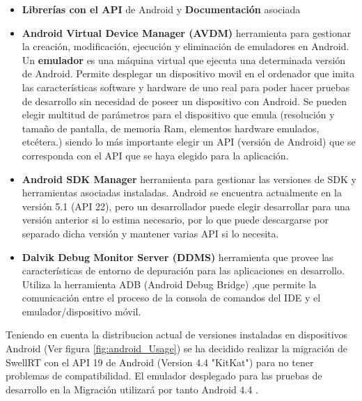    \begin{itemize}
    \item \textbf{Librerías con el API} de Android y \textbf{Documentación} asociada \cite{ref:android_api_reference}
    
    \item \textbf{Android Virtual Device Manager (AVDM)} \cite{ref:android_vdm} herramienta para gestionar la creación, modificación, ejecución y eliminación de emuladores en Android. Un \textbf{emulador} \cite{ref:android_emulator} es una máquina virtual que ejecuta una determinada versión de Android. Permite desplegar un dispositivo movil en el ordenador que imita las características software y hardware de uno real para poder hacer pruebas de desarrollo sin necesidad de poseer un dispositivo con Android. Se pueden elegir multitud de parámetros \cite{ref:android_avd_params} para el dispositivo que emula (resolución y tamaño de pantalla, de memoria Ram, elementos hardware emulados, etcétera.) siendo lo más importante elegir un API (versión de Android) que se corresponda con el API que se haya elegido para la aplicación.
    
    \item \textbf{Android SDK Manager} \cite{ref:android_sdk_manager} herramienta para gestionar las versiones de SDK y herramientas asociadas instaladas. Android se encuentra actualmente en la versión 5.1 (API 22), pero un desarrollador puede elegir desarrollar para una versión anterior si lo estima necesario, por lo que puede descargarse por separado dicha versión y mantener varias API si lo necesita.
    
    \item \textbf{Dalvik Debug Monitor Server (DDMS)} \cite{ref:android_ddms} herramienta que provee las características de entorno de depuración para las aplicaciones en desarrollo. Utiliza la herramienta ADB (Android Debug Bridge) \cite{ref:android_adb},que permite la comunicación entre el proceso de la consola de comandos del IDE y el emulador/dispositivo móvil.

    \end{itemize}
	
	Teniendo en cuenta la distribucion actual de versiones instaladas en dispositivos Android \cite{ref:android_dist} (Ver figura \ref{fig:android_Usage}) se ha decidido realizar la migración de SwellRT con el API 19 de Android (Version 4.4 "KitKat") para no tener problemas de compatibilidad. El emulador desplegado para las pruebas de desarrollo en la Migración utilizará por tanto Android 4.4 .
	
